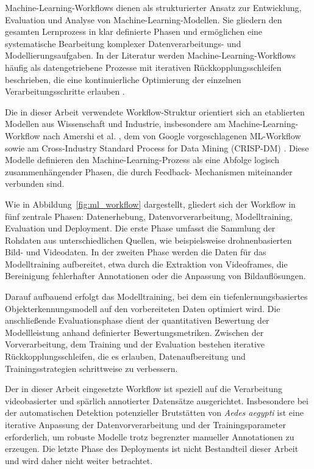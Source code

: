 Machine-Learning-Workflows dienen als strukturierter Ansatz zur
Entwicklung, Evaluation und Analyse von Machine-Learning-Modellen.
Sie gliedern den gesamten Lernprozess in klar definierte Phasen und
ermöglichen eine systematische Bearbeitung komplexer
Datenverarbeitungs- und Modellierungsaufgaben. In der Literatur werden
Machine-Learning-Workflows häufig als datengetriebene Prozesse mit
iterativen Rückkopplungsschleifen beschrieben, die eine kontinuierliche
Optimierung der einzelnen Verarbeitungsschritte erlauben
\cite{Amershi2019}.

Die in dieser Arbeit verwendete Workflow-Struktur orientiert sich an
etablierten Modellen aus Wissenschaft und Industrie, insbesondere am
Machine-Learning-Workflow nach Amershi et al. \cite{Amershi2019}, dem von
Google vorgeschlagenen ML-Workflow \cite{GoogleML2024} sowie am
Cross-Industry Standard Process for Data Mining (CRISP-DM)
\cite{Wirth2000}. Diese Modelle definieren den Machine-Learning-Prozess
als eine Abfolge logisch zusammenhängender Phasen, die durch Feedback-
Mechanismen miteinander verbunden sind.

Wie in Abbildung~\ref{fig:ml_workflow} dargestellt, gliedert sich der
Workflow in fünf zentrale Phasen: Datenerhebung, Datenvorverarbeitung,
Modelltraining, Evaluation und Deployment. Die erste Phase umfasst die
Sammlung der Rohdaten aus unterschiedlichen Quellen, wie beispielsweise
drohnenbasierten Bild- und Videodaten. In der zweiten Phase werden die
Daten für das Modelltraining aufbereitet, etwa durch die Extraktion von
Videoframes, die Bereinigung fehlerhafter Annotationen oder die
Anpassung von Bildauflösungen.

Darauf aufbauend erfolgt das Modelltraining, bei dem ein
tiefenlernungsbasiertes Objekterkennungsmodell auf den vorbereiteten
Daten optimiert wird. Die anschließende Evaluationsphase dient der
quantitativen Bewertung der Modellleistung anhand definierter
Bewertungsmetriken. Zwischen der Vorverarbeitung, dem Training und der
Evaluation bestehen iterative Rückkopplungsschleifen, die es erlauben,
Datenaufbereitung und Trainingsstrategien schrittweise zu verbessern.

Der in dieser Arbeit eingesetzte Workflow ist speziell auf die
Verarbeitung videobasierter und spärlich annotierter Datensätze
ausgerichtet. Insbesondere bei der automatischen Detektion potenzieller
Brutstätten von \textit{Aedes aegypti} ist eine iterative Anpassung der
Datenvorverarbeitung und der Trainingsparameter erforderlich, um
robuste Modelle trotz begrenzter manueller Annotationen zu erzeugen.
Die letzte Phase des Deployments ist nicht Bestandteil dieser Arbeit
und wird daher nicht weiter betrachtet.


